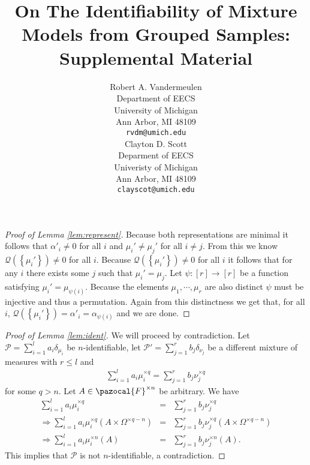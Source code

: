 \documentclass{article} %
\title{On The Identifiability of Mixture Models from Grouped Samples: Supplemental Material}
\author{
Robert A. Vandermeulen\\
Department of EECS\\
University of Michigan\\
Ann Arbor, MI 48109 \\
\texttt{rvdm@umich.edu} \\
\And
Clayton D. Scott \\
Deparment of EECS\\
Univeristy of Michigan\\
Ann Arbor, MI 48109 \\
\texttt{clayscot@umich.edu} \\
}
\def\l{\left}
\def\r{\right}
\def\sF{\pazocal{F}}
\def\sP{\mathscr{P}}
\def\sQ{\mathscr{Q}}
\theoremstyle{definition}
\begin{document}
\maketitle

\appendix
\begin{proof}[Proof of Lemma \ref{lem:represent}]
	Because both representations are minimal it follows that $\alpha'_i \neq 0$ for all $i$ and $\mu_i' \neq \mu_j'$ for all $i \neq j$. From this we know $\sQ\left( \l\{\mu_i'\r\} \right) \neq 0$ for all $i$. Because $\sQ\left( \l\{\mu_i'\r\} \right) \neq 0$ for all $i$ it follows that for any $i$ there exists some $j$ such that $\mu_i' = \mu_j$. Let $\psi: \left[ r \right] \to \left[ r \right]$ be a function satisfying $\mu_i' = \mu_{\psi\left( i \right)}$. Because the elements $\mu_1,\cdots,\mu_r$ are also distinct $\psi$ must be injective and thus a permutation. Again from this distinctness we get that, for all $i$, $\sQ\left( \left\{ \mu_i' \right\}  \right)= \alpha'_i =\alpha_{\psi\left( i \right)}$ and we are done.
\end{proof}
\begin{proof}[Proof of Lemma \ref{lem:ident}]
	We will proceed by contradiction. Let $\sP = \sum_{i=1}^l a_i \delta_{\mu_i}$ be $n$-identifiable, let $\sP' = \sum_{j=1}^r b_j \delta_{\nu_j}$ be a different mixture of measures with $r\le l$ and 
\begin{eqnarray*}
	\sum_{i=1}^l a_i \mu_i^{\times q} = \sum_{j=1}^r b_j \nu_j^{\times q}
\end{eqnarray*}
for some $q>n$. Let $A \in \sF^{\times n}$ be arbitrary. We have
\begin{eqnarray*}
	\sum_{i=1}^l a_i \mu_i^{\times q} &=& \sum_{j=1}^r b_j \nu_j^{\times q}\\
	\Rightarrow \sum_{i=1}^l a_i \mu_i^{\times q}\left( A\times \Omega^{\times q-n} \right) &=& \sum_{j=1}^r b_j \nu_j^{\times q}\left( A\times \Omega^{\times q-n} \right)\\
	\Rightarrow \sum_{i=1}^l a_i \mu_i^{\times n}\left( A \right) &=& \sum_{j=1}^r b_j \nu_j^{\times n}\left( A  \right).
\end{eqnarray*}
This implies that $\sP$ is not $n$-identifiable, a contradiction.
\end{proof}
\end{document}
